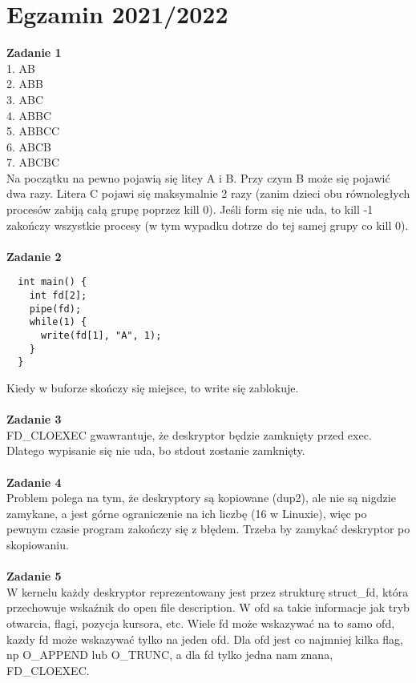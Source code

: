 \documentclass[12pt, a4paper, polish, openany]{book}
\begin{document}
\section{Egzamin 2021/2022}
\textbf{Zadanie 1} \\
1. AB \\
2. ABB \\
3. ABC \\ 
4. ABBC \\
5. ABBCC \\
6. ABCB \\
7. ABCBC \\
Na początku na pewno pojawią się litey A i B. Przy czym B może się pojawić dwa razy. Litera C pojawi się maksymalnie 2 razy (zanim dzieci obu równoległych procesów zabiją całą grupę poprzez kill 0). Jeśli form się nie uda, to kill -1 zakończy wszystkie procesy (w tym wypadku dotrze do tej samej grupy co kill 0). \\\\
\textbf{Zadanie 2} \\
\begin{verbatim}
  int main() {
    int fd[2];
    pipe(fd);
    while(1) {
      write(fd[1], "A", 1);
    }
  } 
\end{verbatim}
Kiedy w buforze skończy się miejsce, to write się zablokuje. \\\\
\textbf{Zadanie 3} \\
FD\_CLOEXEC gwawrantuje, że deskryptor będzie zamknięty przed exec. Dlatego wypisanie się nie uda, bo stdout zostanie zamknięty. \\\\
\textbf{Zadanie 4} \\
Problem polega na tym, że deskryptory są kopiowane (dup2), ale nie są nigdzie zamykane, a jest górne ograniczenie na ich liczbę (16 w Linuxie), więc po pewnym czasie program zakończy się z błędem. Trzeba by zamykać deskryptor po skopiowaniu. \\\\
\textbf{Zadanie 5} \\
W kernelu każdy deskryptor reprezentowany jest przez strukturę struct\_fd, która przechowuje wskaźnik do open file description. W ofd sa takie informacje jak tryb otwarcia, flagi, pozycja kursora, etc. Wiele fd może wskazywać na to samo ofd, kazdy fd może wskazywać tylko na jeden ofd. Dla ofd jest co najmniej kilka flag, np O\_APPEND lub O\_TRUNC, a dla fd tylko jedna nam znana, FD\_CLOEXEC. \\\\
\end{document}
